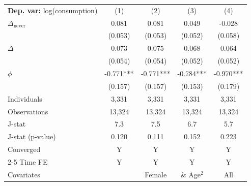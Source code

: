 \begin{tabular}{l cccc} \toprule  \textbf{Dep. var:}  log(consumption) 
                    &\multicolumn{1}{c}{(1)}   &\multicolumn{1}{c}{(2)}   &\multicolumn{1}{c}{(3)}   &\multicolumn{1}{c}{(4)}   \\

\addlinespace
$\Delta_{\text{never}}$&       0.081   &       0.081   &       0.049   &      -0.028   \\
                    &     (0.053)   &     (0.053)   &     (0.052)   &     (0.058)   \\

\addlinespace
$\bar{\Delta}$      &       0.073   &       0.075   &       0.068   &       0.064   \\
                    &     (0.054)   &     (0.054)   &     (0.052)   &     (0.052)   \\

\addlinespace
$\phi$              &      -0.771***&      -0.771***&      -0.784***&      -0.970***\\
                    &     (0.157)   &     (0.157)   &     (0.153)   &     (0.179)   \\
\addlinespace
Individuals         &       3,331   &       3,331   &       3,331   &       3,331   \\
Observations        &      13,324   &      13,324   &      13,324   &      13,324   \\
J-stat              &         7.3   &         7.5   &         6.7   &         5.7   \\
J-stat (p-value)    &       0.120   &       0.111   &       0.152   &       0.223   \\
Converged           &           Y   &           Y   &           Y   &           Y   \\
\cmidrule{2-5} Time FE & Y & Y & Y & Y \\ Covariates & & Female & \& Age$^2$ & All \\ \bottomrule \end{tabular}

